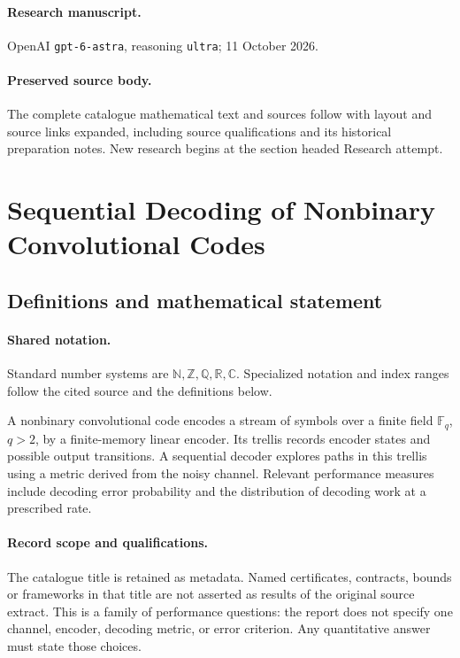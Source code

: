 \documentclass[11pt]{article}
\begin{document}
\paragraph{Research manuscript.} OpenAI \texttt{gpt-6-astra}, reasoning \texttt{ultra}; 11 October 2026.
\paragraph{Preserved source body.} The complete catalogue mathematical text and sources follow with layout and source links expanded, including source qualifications and its historical preparation notes. New research begins at the section headed Research attempt.

\section{Sequential Decoding of Nonbinary Convolutional Codes}\label{statement}

\subsection{Definitions and mathematical statement}

\paragraph{Shared notation.}Standard number systems are $\mathbb N,\mathbb Z,\mathbb Q,\mathbb R,\mathbb C$. Specialized notation and index ranges follow the cited source and the definitions below.


A nonbinary convolutional code encodes a stream of symbols over a finite field $\mathbb F_q$, $q>2$, by a finite-memory linear encoder. Its trellis records encoder states and possible output transitions. A sequential decoder explores paths in this trellis using a metric derived from the noisy channel. Relevant performance measures include decoding error probability and the distribution of decoding work at a prescribed rate.
\paragraph{Record scope and qualifications.}
The catalogue title is retained as metadata. Named certificates, contracts, bounds or frameworks in that title are not asserted as results of the original source extract.
This is a family of performance questions: the report does not specify one channel, encoder, decoding metric, or error criterion. Any quantitative answer must state those choices.
\end{document}
